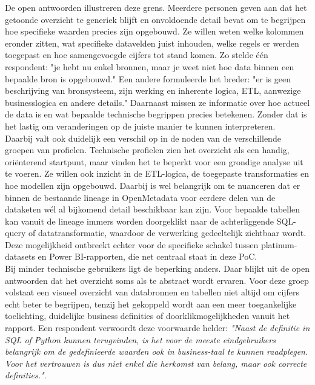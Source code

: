 De open antwoorden illustreren deze grens. Meerdere personen geven aan dat het getoonde overzicht te generiek blijft en onvoldoende detail bevat om te begrijpen hoe specifieke waarden precies zijn opgebouwd. Ze willen weten welke kolommen eronder zitten, wat specifieke datavelden juist inhouden, welke regels er werden toegepast en hoe samengevoegde cijfers tot stand komen. Zo stelde één respondent: "je hebt nu enkel bronnen, maar je weet niet hoe data binnen een bepaalde bron is opgebouwd." Een andere formuleerde het breder: "er is geen beschrijving van bronsysteem, zijn werking en inherente logica, ETL, aanwezige businesslogica en andere details." Daarnaast missen ze informatie over hoe actueel de data is en wat bepaalde technische begrippen precies betekenen. Zonder dat is het lastig om veranderingen op de juiste manier te kunnen interpreteren.\\

Daarbij valt ook duidelijk een verschil op in de noden van de verschillende groepen van profielen. Technische profielen zien het overzicht als een handig, oriënterend startpunt, maar vinden het te beperkt voor een grondige analyse uit te voeren. Ze willen ook inzicht in de ETL-logica, de toegepaste transformaties en hoe modellen zijn opgebouwd. Daarbij is wel belangrijk om te nuanceren dat er binnen de bestaande lineage in OpenMetadata voor eerdere delen van de dataketen wél al bijkomend detail beschikbaar kan zijn. Voor bepaalde tabellen kan vanuit de lineage immers worden doorgeklikt naar de achterliggende SQL-query of datatransformatie, waardoor de verwerking gedeeltelijk zichtbaar wordt. Deze mogelijkheid ontbreekt echter voor de specifieke schakel tussen platinum-datasets en Power BI-rapporten, die net centraal staat in deze PoC.\\

Bij minder technische gebruikers ligt de beperking anders. Daar blijkt uit de open antwoorden dat het overzicht soms als te abstract wordt ervaren. Voor deze groep volstaat een visueel overzicht van databronnen en tabellen niet altijd om cijfers echt beter te begrijpen, tenzij het gekoppeld wordt aan een meer toegankelijke toelichting, duidelijke business definities of doorklikmogelijkheden vanuit het rapport. Een respondent verwoordt deze voorwaarde helder: \textit{"Naast de definitie in SQL of Python kunnen terugvinden, is het voor de meeste eindgebruikers belangrijk om de gedefinieerde waarden ook in business-taal te kunnen raadplegen. Voor het vertrouwen is dus niet enkel die herkomst van belang, maar ook correcte definities."}.\\

